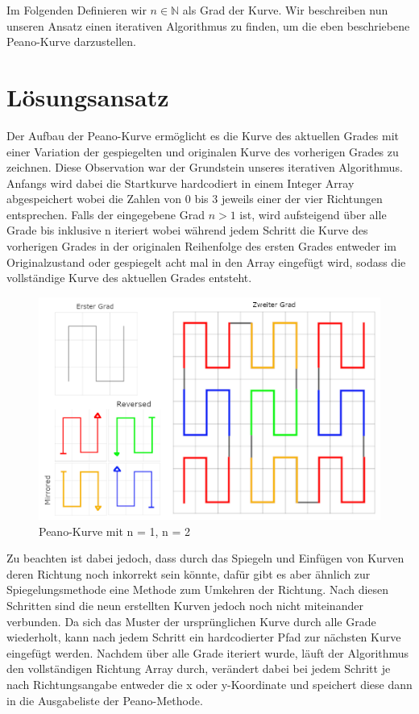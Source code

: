 \documentclass[course=asp]{aspdoc}
\begin{document}
Im Folgenden Definieren wir $n \in \mathbb{N}$ als Grad der Kurve.
Wir beschreiben nun unseren Ansatz einen iterativen Algorithmus zu finden, um die eben beschriebene Peano-Kurve darzustellen. %

\newpage

\section{Lösungsansatz}
Der Aufbau der Peano-Kurve ermöglicht es die Kurve des aktuellen Grades mit einer Variation der gespiegelten und originalen Kurve des vorherigen Grades zu zeichnen.
Diese Observation war der Grundstein unseres iterativen Algorithmus. Anfangs wird dabei die Startkurve hardcodiert in einem Integer Array abgespeichert wobei die Zahlen von 0 bis 3 jeweils einer der vier Richtungen entsprechen. Falls der eingegebene Grad $n > 1$ ist, wird aufsteigend über alle Grade bis inklusive n iteriert wobei während jedem Schritt die Kurve des vorherigen Grades in der originalen Reihenfolge des ersten Grades entweder im Originalzustand oder gespiegelt acht mal in den Array eingefügt wird, sodass die vollständige Kurve des aktuellen Grades entsteht. 

\begin{figure} 	%
\centering
\includegraphics[scale=0.7]{PeanoFarbcodiert.png}
\caption{Peano-Kurve mit n = 1, n = 2}\label{Abb:Peano Lösungsidee}
\end{figure}

Zu beachten ist dabei jedoch, dass durch das Spiegeln und Einfügen von Kurven deren Richtung noch inkorrekt sein könnte, dafür gibt es aber ähnlich zur Spiegelungsmethode eine Methode zum Umkehren der Richtung. Nach diesen Schritten sind die neun erstellten Kurven jedoch noch nicht miteinander verbunden. Da sich das Muster der ursprünglichen Kurve durch alle Grade wiederholt, kann nach jedem Schritt ein hardcodierter Pfad zur nächsten Kurve eingefügt werden.
Nachdem über alle Grade iteriert wurde, läuft der Algorithmus den vollständigen Richtung Array durch, verändert dabei bei jedem Schritt je nach Richtungsangabe entweder die x oder y-Koordinate und speichert diese dann in die Ausgabeliste der Peano-Methode.
\end{document}
